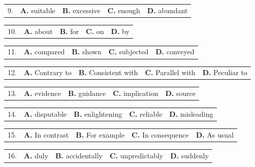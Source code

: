 \documentclass[UTF8,11pt]{ctexart}
\begin{document}
\noindent\begin{tabularx}{\linewidth}{@{}lXXXX@{}}9. & \textbf{A.} suitable & \textbf{B.} excessive & \textbf{C.} enough & \textbf{D.} abundant\\\end{tabularx}\par

\noindent\begin{tabularx}{\linewidth}{@{}lXXXX@{}}10. & \textbf{A.} about & \textbf{B.} for & \textbf{C.} on & \textbf{D.} by\\\end{tabularx}\par

\noindent\begin{tabularx}{\linewidth}{@{}lXXXX@{}}11. & \textbf{A.} compared & \textbf{B.} shown & \textbf{C.} subjected & \textbf{D.} conveyed\\\end{tabularx}\par

\noindent\begin{tabularx}{\linewidth}{@{}lXXXX@{}}12. & \textbf{A.} Contrary to & \textbf{B.} Consistent with & \textbf{C.} Parallel with & \textbf{D.} Peculiar to\\\end{tabularx}\par

\noindent\begin{tabularx}{\linewidth}{@{}lXXXX@{}}13. & \textbf{A.} evidence & \textbf{B.} guidance & \textbf{C.} implication & \textbf{D.} source\\\end{tabularx}\par

\noindent\begin{tabularx}{\linewidth}{@{}lXXXX@{}}14. & \textbf{A.} disputable & \textbf{B.} enlightening & \textbf{C.} reliable & \textbf{D.} misleading\\\end{tabularx}\par

\noindent\begin{tabularx}{\linewidth}{@{}lXXXX@{}}15. & \textbf{A.} In contrast & \textbf{B.} For example & \textbf{C.} In consequence & \textbf{D.} As usual\\\end{tabularx}\par

\noindent\begin{tabularx}{\linewidth}{@{}lXXXX@{}}16. & \textbf{A.} duly & \textbf{B.} accidentally & \textbf{C.} unpredictably & \textbf{D.} suddenly\\\end{tabularx}\par
\end{document}
